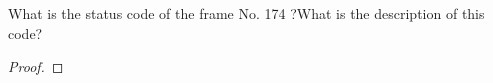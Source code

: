 \documentclass[../../main.tex]{subfiles}
\begin{document}
\begin{wts}
What is the status code of the frame No. 174 ?What is the description of this code? 
\end{wts}
\begin{proof}

\end{proof}
\end{document}

